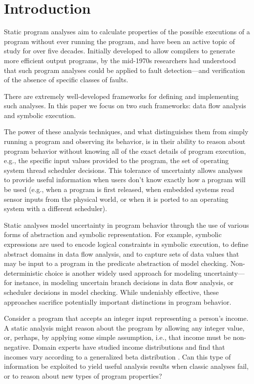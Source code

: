 \section{Introduction}
\label{sec:introduction}

Static program analyses aim to calculate properties of 
the possible executions of a program without ever running the program,
and have been an active topic of study for over five decades.
Initially developed to allow compilers to generate more efficient
output programs, by the mid-1970s \cite{fosdick1976data} researchers had
understood that such program analyses could be applied to fault
detection---and verification of the absence of specific classes of faults.

There are extremely well-developed frameworks for defining
and implementing such analyses.  In this paper we focus on two
such frameworks: data flow analysis and symbolic execution.

The power of these analysis techniques, and what distinguishes them from
simply running a program and observing its behavior, is in their
ability to reason about program behavior without knowing all of the
exact details of program execution, e.g., the specific 
input values provided to the program, the set of operating system
thread scheduler decisions.  This tolerance of uncertainty allows analyses
to provide useful information when users don't know exactly how
a program will be used (e.g., when a program is first released, when
embedded systems read sensor inputs from the physical world, or
when it is ported to an operating system with a different scheduler).

Static analyses model uncertainty in program behavior
through the use of various forms of abstraction and symbolic representation.
For example, symbolic expressions are used to encode logical constraints 
in symbolic execution, to define abstract domains
in data flow analysis, and to capture sets of data values that may be input
to a program in the predicate abstraction of model checking.
Non-deterministic choice is another widely used approach for modeling
uncertainty---for instance, in modeling uncertain branch 
decisions in data flow analysis,
or scheduler decisions in model checking.
While undeniably effective, these approaches sacrifice potentially
important distinctions in program behavior.   

Consider a program that accepts an integer input representing
a person's income.  A static analysis might reason about the program
by allowing any integer value, or, perhaps, by applying
some simple assumption, i.e., that income must be non-negative.
Domain experts have studied income distributions and find that
incomes vary according to a generalized beta distribution 
\cite{mcdonald1984some,thurow1970analyzing}.  Can this type of information be 
exploited to yield useful analysis results when classic
analyses fail, or to reason about new types of program properties?

